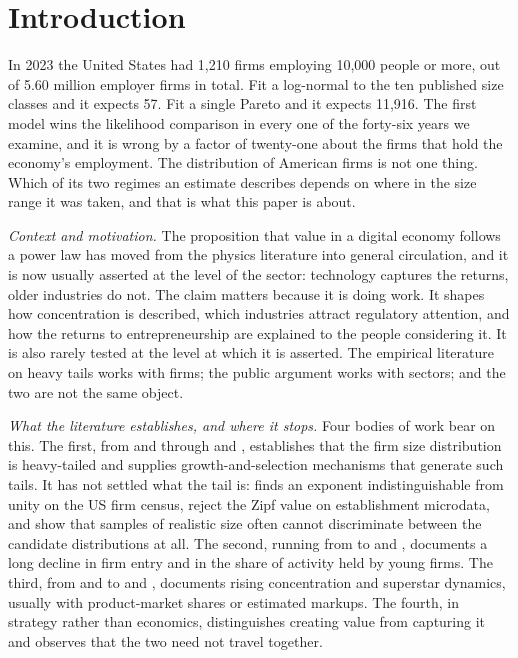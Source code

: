 \documentclass[jrfm,article,submit,pdftex,moreauthors]{Definitions/mdpi}
\begin{document}
\maketitle

\section{Introduction}
\label{sec:intro}

In 2023 the United States had 1{,}210 firms employing 10{,}000 people or more, out of 5.60
million employer firms in total. Fit a log-normal to the ten published size classes and it
expects 57. Fit a single Pareto and it expects 11{,}916. The first model wins the likelihood
comparison in every one of the forty-six years we examine, and it is wrong by a factor of
twenty-one about the firms that hold the economy's employment. The distribution of American firms is not one thing. Which of its two regimes an
estimate describes depends on where in the size range it was taken, and that is what
this paper is about.

\emph{Context and motivation.} The proposition that value in a digital economy follows a
power law has moved from the physics literature into general circulation, and it is now
usually asserted at the level of the sector: technology captures the returns, older
industries do not. The claim matters because it is doing work. It shapes how concentration
is described, which industries attract regulatory attention, and how the returns to
entrepreneurship are explained to the people considering it. It is also rarely tested at
the level at which it is asserted. The empirical literature on heavy tails works with
firms; the public argument works with sectors; and the two are not the same object.

\emph{What the literature establishes, and where it stops.} Four bodies of work bear on
this. The first, from \citet{Gibrat1931} and \citet{Simon1955} through \citet{Axtell2001}
and \citet{Luttmer2007}, establishes that the firm size distribution is heavy-tailed and
supplies growth-and-selection mechanisms that generate such tails. It has not settled what
the tail is: \citet{Axtell2001} finds an exponent indistinguishable from unity on the US
firm census, \citet{KondoLewisStella2023} reject the Zipf value on establishment microdata,
and \citet{ClausetShaliziNewman2009} show that samples of realistic size often cannot
discriminate between the candidate distributions at all. The second, running from
\citet{DunneRobertsSamuelson1988} to \citet{DeckerEtAl2016} and \citet{AkcigitAtes2021},
documents a long decline in firm entry and in the share of activity held by young firms.
The third, from \citet{Rosen1981} and \citet{FrankCook1995} to \citet{AutorEtAl2020} and
\citet{DeLoeckerEeckhoutUnger2020}, documents rising concentration and superstar dynamics,
usually with product-market shares or estimated markups. The fourth, in strategy rather
than economics, distinguishes creating value from capturing it \citep{Teece1986,
BrandenburgerStuart1996} and observes that the two need not travel together.
\end{document}
